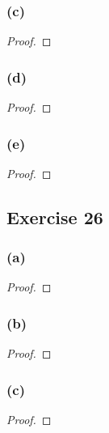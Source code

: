 \documentclass[14pt]{extarticle}
\begin{document}
\subsubsection{(c)}

\begin{proof}

\end{proof}

\subsubsection{(d)}

\begin{proof}

\end{proof}

\subsubsection{(e)}

\begin{proof}

\end{proof}

\subsection{Exercise 26}

\subsubsection{(a)}

\begin{proof}

\end{proof}

\subsubsection{(b)}

\begin{proof}

\end{proof}

\subsubsection{(c)}

\begin{proof}

\end{proof}
\end{document}
